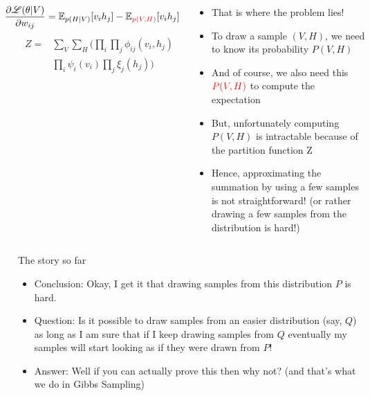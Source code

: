 \begin{frame}
	\begin{columns}
		\begin{overlayarea}{\textwidth}{\textheight}
			\begin{align*}
				\hspace{-0.5cm}\frac{\partial \mathscr{L}(\theta|V)}{\partial w_{ij}} = \mathbb{E}_{p(H|V)} [v_i h_j] - \mathbb{E}_{\color{red} p(V,H)} \color{black}[v_i h_j]
			\end{align*}
			\footnotesize{\begin{align*}
				Z=&\sum_V \sum_H \Big( \prod_i\prod_j \phi_{ij}(v_i, h_j) \\
				&\prod_i \psi_i(v_i) \prod_j \xi_j(h_j) \Big)
			\end{align*}}
		\end{overlayarea}
		\begin{overlayarea}{\textwidth}{\textheight}
					\begin{itemize}
				\item<1-> That is where the problem lies!
				\item<2-> To draw a sample $(V,H)$, we need to know its probability $P(V,H)$
				\item<3-> And of course, we also need this $\color{red}P(V,H)$\color{black} to compute the expectation 
				\item<4-> But, unfortunately computing $P(V,H)$ is intractable because of the partition function Z 
				\item<5-> Hence, approximating the summation by using a few samples is not straightforward! (or rather drawing a few samples from the distribution is hard!)
			\end{itemize}
		\end{overlayarea}
	\end{columns}
\end{frame}



\begin{frame}
	\begin{block}{The story so far}
		\begin{itemize}
			\item<1-> Conclusion: Okay, I get it that drawing samples from this distribution $P$ is hard. 
			\item<2-> Question: Is it possible to draw samples from an easier distribution (say, $Q$) as long as I am sure that if I keep drawing samples from $Q$ eventually my samples will start looking as if they were drawn from $P$!
			\item<3-> Answer: Well if you can actually prove this then why not? (and that's what we do in Gibbs Sampling)
		\end{itemize}
	\end{block}
\end{frame}
